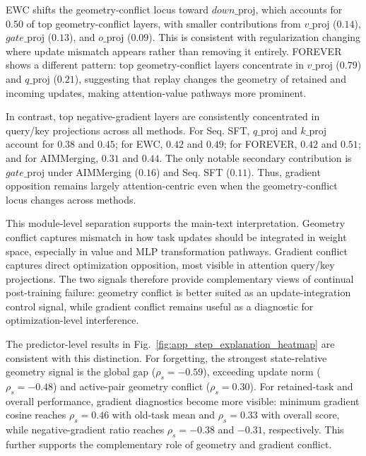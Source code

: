 \documentclass{article}
\begin{document}
EWC shifts the geometry-conflict locus toward \(down\_\mathrm{proj}\), which accounts for \(0.50\) of top geometry-conflict layers, with smaller contributions from \(v\_\mathrm{proj}\) (\(0.14\)), \(gate\_\mathrm{proj}\) (\(0.13\)), and \(o\_\mathrm{proj}\) (\(0.09\)).
This is consistent with regularization changing where update mismatch appears rather than removing it entirely.
FOREVER shows a different pattern: top geometry-conflict layers concentrate in \(v\_\mathrm{proj}\) (\(0.79\)) and \(q\_\mathrm{proj}\) (\(0.21\)), suggesting that replay changes the geometry of retained and incoming updates, making attention-value pathways more prominent.

In contrast, top negative-gradient layers are consistently concentrated in query/key projections across all methods.
For Seq. SFT, \(q\_\mathrm{proj}\) and \(k\_\mathrm{proj}\) account for \(0.38\) and \(0.45\); for EWC, \(0.42\) and \(0.49\); for FOREVER, \(0.42\) and \(0.51\); and for AIMMerging, \(0.31\) and \(0.44\).
The only notable secondary contribution is \(gate\_\mathrm{proj}\) under AIMMerging (\(0.16\)) and Seq. SFT (\(0.11\)).
Thus, gradient opposition remains largely attention-centric even when the geometry-conflict locus changes across methods.

This module-level separation supports the main-text interpretation.
Geometry conflict captures mismatch in how task updates should be integrated in weight space, especially in value and MLP transformation pathways.
Gradient conflict captures direct optimization opposition, most visible in attention query/key projections.
The two signals therefore provide complementary views of continual post-training failure: geometry conflict is better suited as an update-integration control signal, while gradient conflict remains useful as a diagnostic for optimization-level interference.

The predictor-level results in Fig.~\ref{fig:app_step_explanation_heatmap} are consistent with this distinction.
For forgetting, the strongest state-relative geometry signal is the global gap (\(\rho_s=-0.59\)), exceeding update norm (\(\rho_s=-0.48\)) and active-pair geometry conflict (\(\rho_s=0.30\)).
For retained-task and overall performance, gradient diagnostics become more visible: minimum gradient cosine reaches \(\rho_s=0.46\) with old-task mean and \(\rho_s=0.33\) with overall score, while negative-gradient ratio reaches \(\rho_s=-0.38\) and \(-0.31\), respectively.
This further supports the complementary role of geometry and gradient conflict.
\end{document}
